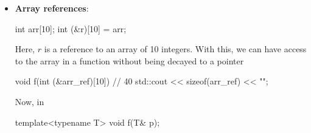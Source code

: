 \documentclass{report}
\begin{document}
\begin{itemize}
\begin{enumerate}
\begin{cppcode}
                    int x = 27;
                    const int cx = x;
                    const int& rx = x;
                    \end{cppcode}
                    \bigbreak \noindent 
                    Calling $f$ with $x,cx$, and $rx$ deduces $T$ as int, const int, const int.
                \item \textbf{ParamType} is a universal reference. If expr is an lvalue, both T and ParamType are deduced to be lvalue references. If expr is an rvalue, the “normal” (i.e., Case 1) rules apply.
                    \bigbreak \noindent 
                    Universal references are described heavily in a section above and will likely be described in more detail later.
                \item \textbf{ParamType} is neither a pointer nor a reference. As before, if expr’s type is a reference, ignore the reference part. If, after ignoring expr’s reference-ness, expr is const, ignore that, too. If it’s volatile, also ignore that. 
                    \bigbreak \noindent 
                    \begin{cppcode}
                        template<typename T>
                        void f(T param);

                        int x = 27;
                        const int cx = x;
                        const int& rx = x;
                    \end{cppcode}
                    \bigbreak \noindent 
                    Calling $f$ with $x,cx$, and $rx$ deduces $T$ as int in every call.
                    \bigbreak \noindent 
                    Note that even though cx and rx represent const values, param isn’t const. That makes sense. param is an object that’s completely independent of cx and rx—a copy of cx or rx. The fact that cx and rx can’t be modified says nothing about whether param can be. That’s why expr’s constness (and volatileness, if any) is ignored when deducing a type for param: just because expr can’t be modified doesn’t mean that a copy of it can’t be.
            \end{enumerate}
        \item \textbf{Array references}:
            \bigbreak \noindent 
            \begin{cppcode}
            int arr[10]; 
            int (&r)[10] = arr;
            \end{cppcode}
            \bigbreak \noindent 
            Here, $r$ is a reference to an array of 10 integers. With this, we can have access to the array in a function without being decayed to a pointer
            \bigbreak \noindent 
            \begin{cppcode}
                void f(int (&arr_ref)[10]) {
                    // 40
                    std::cout << sizeof(arr_ref) << "\n";
                }
            \end{cppcode}
            \bigbreak \noindent 
            Now, in
            \bigbreak \noindent 
            \begin{cppcode}
            template<typename T>
            void f(T& p);


\end{cppcode}
\end{itemize}
\end{document}
